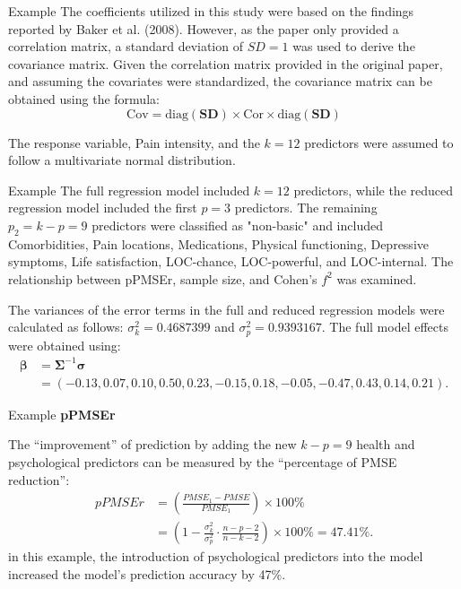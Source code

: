 \documentclass{beamer}
\newcommand{\Cov}{\mathrm{Cov}}
\newcommand{\Cor}{\mathrm{Cor}}
\begin{document}
\begin{frame}{Example}
The coefficients utilized in this study were based on the findings reported by Baker et al. (2008). However, as the paper only provided a correlation matrix, a standard deviation of $SD=1$ was used to derive the covariance matrix.
Given the correlation matrix provided in the original paper, and assuming the covariates were standardized, the covariance matrix can be obtained using the formula:
\begin{equation*}
\bm{\Cov} = \text{diag}(\bm{SD}) \times \bm{\Cor} \times \text{diag}(\bm{SD})
\end{equation*}

The response variable, Pain intensity, and the $k = 12$ predictors were assumed to follow a multivariate normal distribution.
\end{frame}


\begin{frame}{Example}
The full regression model included $k=12$ predictors, while the reduced regression model included the first $p=3$ predictors. The remaining $p_2=k-p=9$ predictors were classified as "non-basic" and included Comorbidities, Pain locations, Medications, Physical functioning, Depressive symptoms, Life satisfaction, LOC-chance, LOC-powerful, and LOC-internal.
The relationship between pPMSEr, sample size, and Cohen's $f^2$ was examined.

The variances of the error terms in the full and reduced regression models were calculated as follows: $\sigma^2_k = 0.4687399$ and $\sigma^2_p = 0.9393167$.
The full model effects were obtained using:
\begin{equation}\begin{aligned}
\label{eq:full.coeff}
\boldsymbol{\beta} &= \boldsymbol{\Sigma}^{-1}\boldsymbol{\sigma} \\
&= (-0.13,  0.07,  0.10,  0.50,  0.23, -0.15,  0.18, -0.05, -0.47,  0.43,  0.14,  0.21). 
\end{aligned}\end{equation}
\end{frame}




\begin{frame}{Example}
\textbf{pPMSEr}

The “improvement” of prediction by adding the new $k-p=9$ health and psychological predictors can be measured by the “percentage of PMSE reduction”:
$$\begin{aligned}
pPMSEr &= \left(\frac{PMSE_1 - PMSE}{PMSE_1} \right)\times 100\%\\
&= \left(1 - \frac{\sigma_k^2}{\sigma_p^2} \cdot \frac{n-p-2}{n-k-2}\right)\times 100\% = 47.41\%.
\end{aligned}$$
in this example, the introduction of psychological predictors into the model increased the model's prediction accuracy by 47\%.
\end{frame}
\end{document}
